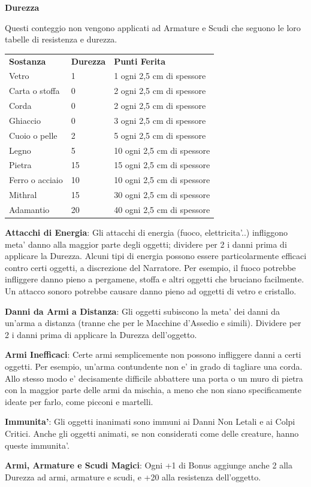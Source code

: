 \documentclass[a4paper,11pt,twoside,openany]{book}
\begin{document}
{\textbf{Durezza}

Questi conteggio non vengono applicati ad Armature e Scudi che seguono le loro tabelle di resistenza e durezza.

\bigskip

\begin{tabular}{lll}
\toprule
\textbf{Sostanza} & \textbf{Durezza} & \textbf{Punti Ferita} \tabularnewline
Vetro & 1 & 1 ogni 2,5 cm di spessore\tabularnewline
Carta o stoffa & 0 & 2 ogni 2,5 cm di spessore\tabularnewline
Corda & 0 & 2 ogni 2,5 cm di spessore\tabularnewline
Ghiaccio & 0 & 3 ogni 2,5 cm di spessore\tabularnewline
Cuoio o pelle & 2 & 5 ogni 2,5 cm di spessore\tabularnewline
Legno & 5 & 10 ogni 2,5 cm di spessore\tabularnewline
Pietra & 15 & 15 ogni 2,5 cm di spessore\tabularnewline
Ferro o acciaio & 10 & 10 ogni 2,5 cm di spessore\tabularnewline
Mithral & 15 & 30 ogni 2,5 cm di spessore\tabularnewline
Adamantio & 20 & 40 ogni 2,5 cm di spessore\tabularnewline
\end{tabular}

\bigskip

\textbf{Attacchi di Energia}: Gli attacchi di energia (fuoco, elettricita'..) infliggono meta' danno alla maggior parte degli oggetti; dividere per 2 i danni prima di applicare la Durezza. Alcuni tipi di energia possono essere particolarmente efficaci contro certi oggetti, a discrezione del Narratore. 
Per esempio, il fuoco potrebbe infliggere danno pieno a pergamene, stoffa e altri oggetti che bruciano facilmente. Un attacco sonoro potrebbe causare danno pieno ad oggetti di vetro e cristallo.

\textbf{Danni da Armi a Distanza}: Gli oggetti subiscono la meta' dei danni da un'arma a distanza (tranne che per le Macchine d'Assedio e simili). Dividere per 2 i danni prima di applicare la Durezza dell'oggetto.

\textbf{Armi Inefficaci}: Certe armi semplicemente non possono infliggere danni a certi oggetti. Per esempio, un'arma contundente non e' in grado di tagliare una corda.
Allo stesso modo e' decisamente difficile abbattere una porta o un muro di pietra con la maggior parte delle armi da mischia, a meno che non siano specificamente ideate per farlo, come picconi e martelli.

\textbf{Immunita'}: Gli oggetti inanimati sono immuni ai Danni Non Letali e ai Colpi Critici. Anche gli oggetti animati, se non considerati come delle creature, hanno queste immunita'.

\textbf{Armi, Armature e Scudi Magici}: Ogni +1 di Bonus aggiunge anche 2 alla Durezza ad armi, armature e scudi, e +20 alla resistenza dell'oggetto.

}
\end{document}
